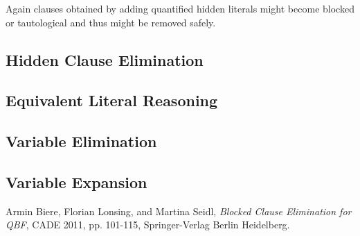 \documentclass{scrartcl}
\begin{document}
Again clauses obtained by adding quantified hidden literals might become blocked
or tautological and thus might be removed safely. 

\subsection{Hidden Clause Elimination}

\subsection{Equivalent Literal Reasoning}
\subsection{Variable Elimination}
\subsection{Variable Expansion}
    
\begin{thebibliography}{9}
Armin Biere, Florian Lonsing, and Martina Seidl,
\emph{Blocked Clause Elimination for QBF},
CADE 2011,
pp. 101-115,
Springer-Verlag Berlin Heidelberg.
\end{thebibliography}
\end{document}
